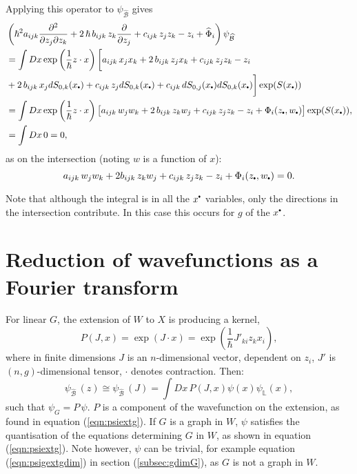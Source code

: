     Applying this operator to \( \psi_{\widehat{\mathcal{B}}}\) gives
    \begin{align*}
    &\left(\hslash^2 a_{ijk} \frac{\partial^2}{\partial z_j \partial z_k} +  2 \,\hslash \,  b_{ijk} \,  z_k \frac{\partial}{\partial z_j} + c_{ijk}\, z_j z_k - z_i  + \widehat{\Phi}_i \right) \psi_{\widehat{\mathcal{B}}}\\ 
    &= \int Dx  \exp\left( \frac{1}{\hslash} z \cdot x\right) \bigg[  a_{ijk} \, x_j x_k + 2  \, b_{ijk}\, z_j x_k   + c_{ijk}\, z_j z_k   - z_i  \\
    & + 2 \,b_{ijk} \, x_j dS_{0,k}(x_{\sbt}) + c_{ijk}\, z_j dS_{0,k}(x_{\sbt}) + c_{ijk} \,  dS_{0,j}(x_{\sbt}) dS_{0,k}(x_{\sbt})\bigg]  \exp(S(x_{\sbt}))\\
    &= \int Dx \exp\left( \frac{1}{\hslash} z \cdot x\right) \big[  a_{ijk}\, w_j w_k + 2\,  b_{ijk}\, z_k w_j+ c_{ijk}\, z_j z_k - z_i   +  \Phi_i(z_{\sbt},w_{\sbt})  \big] \exp(S(x_{\sbt})), \\
    &= \int Dx\, 0 = 0,
    \end{align*}
    as on the intersection (noting \(w\) is a function of \(x\)): 
    \[  a_{ijk}\, w_j w_k + 2 b_{ijk}\, z_k w_j+ c_{ijk}\, z_j z_k - z_i   +  \Phi_i(z_{\sbt},w_{\sbt})   = 0.\]
    
    \begin{rem}
    Note that although the integral is in all the \(x^{\sbt}\) variables, only the directions in the intersection contribute. In this case this occurs for \(g\) of the \(x^{\sbt}\). 
    \end{rem}

    
    
    \section{Reduction of wavefunctions as a Fourier transform}
    
    
    For linear \(G\), the extension of \(W\) to \( X\) is producing a kernel, \[P(J,x) = \exp(J\cdot x) =  \exp\left( \frac{1}{\hslash }J'_{ki}z_k x_i  \right) ,\] where in finite dimensions \(J\) is an \( n\)-dimensional vector, dependent on \(z_i\), \(J'\) is \((n,g)\)-dimensional tensor, \(\cdot\) denotes contraction. Then:
    \[  \psi_{\widehat{\mathcal{B}}}\,(z) \cong \psi_{\widehat{\mathcal{B}}}\,(J) =\int Dx\,P(J,x) \psi(x) \psi_{\mathbb{L}}(x),\]
    such that \( \psi_{G} = P\, \psi\). \(P\) is a component of the wavefunction on the extension, as found in equation (\ref{eqn:psiextg}).  If \(G\) is a graph in \(W\), \( \psi\) satisfies the quantisation of the equations determining \(G\) in \(W\), as shown in equation (\ref{eqn:psiextg}). Note however, \( \psi\) can be trivial, for example equation (\ref{eqn:psigextgdim}) in section (\ref{subsec:gdimG}), as \(G\) is not a graph in \(W\). 
    
